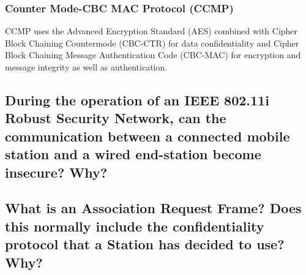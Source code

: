 \documentclass{report}
\begin{document}
			\subsubsection{Counter Mode-CBC MAC Protocol (CCMP)}
			\startsubsection
				CCMP uses the Advanced Encryption Standard (AES) combined with Cipher Block Chaining Countermode (CBC-CTR) for data confidentiality and Cipher Block Chaining Message Authentication Code (CBC-MAC) for encryption and message integrity as well as authentication.
			\closesection
		\closesection
		
		\subsection{During the operation of an IEEE 802.11i Robust Security Network, can the communication between a connected mobile station and a wired end-station become insecure? Why?}
		\startsubsection
		\closesection
		
		\subsection{What is an Association Request Frame? Does this normally include the confidentiality protocol that a Station has decided to use? Why?}
		\startsubsection
		\closesection
	\closesection
\end{document}
